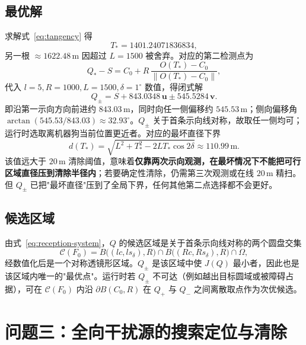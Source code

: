 \documentclass[12pt,a4paper]{ctexart}
\begin{document}
\subsection{最优解}
\label{sec:q2-solution}
求解式~\eqref{eq:tangency} 得
\begin{equation}
 T_*=1401.24071836834,
 \label{eq:T-star}
\end{equation}
另一根 $\approx 1622.48\,\mathrm{m}$ 因超过 $L=1500$ 被舍弃。对应的第二检测点为
\begin{equation}
 Q_*-S=C_0+R\,\frac{O(T_*)-C_0}{\|O(T_*)-C_0\|},
 \label{eq:Q-star}
\end{equation}
代入 $l=5,R=1000,L=1500,\delta=1^\circ$ 数值，得闭式解
\begin{equation}
 \boxed{\;Q_\pm=S+843.0348\,\bm u\pm545.5284\,\bm v.\;}
 \label{eq:Q-pm}
\end{equation}
即沿第一示向方向前进约 $843.03\,\mathrm{m}$，同时向任一侧偏移约 $545.53\,\mathrm{m}$；侧向偏移角 $\arctan(545.53/843.03)\approx32.93^\circ$。$Q_\pm$ 关于首条示向线对称，故取任一侧均可；运行时选取离机器狗当前位置更近者。对应的最坏直径下界
\[
 d(T_*)=\sqrt{L^2+T_*^2-2LT_*\cos2\delta}\approx110.99\,\mathrm{m}.
\]
该值远大于 $20\,\mathrm{m}$ 清除阈值，意味着\textbf{仅靠两次示向观测，在最坏情况下不能把可行区域直径压到清除半径内}；若要确定性清除，仍需第三次观测或在线 $20\,\mathrm{m}$ 精扫。但 $Q_\pm$ 已把"最坏直径"压到了全局下界，任何其他第二点选择都不会更好。

\subsection{候选区域}
由式~\eqref{eq:reception-system}，$Q$ 的候选区域是关于首条示向线对称的两个圆盘交集
\[
 \mathcal C(F_0)=B\bigl((lc,ls_\delta),R\bigr)\cap B\bigl((Rc,Rs_\delta),R\bigr)\cap\Omega,
\]
经数值化后是一个对称透镜形区域。$Q_\pm$ 是该区域中使 $J(Q)$ 最小者，因此也是该区域内唯一的"最优点"。运行时若 $Q_\pm$ 不可达（例如越出目标圆域或被障碍占据），可在 $\mathcal C(F_0)$ 内沿 $\partial B(C_0,R)$ 在 $Q_+$ 与 $Q_-$ 之间离散取点作为次优候选。

\section{问题三：全向干扰源的搜索定位与清除}
\end{document}
